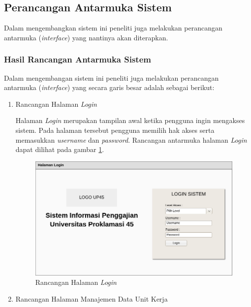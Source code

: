 		\subsection{Perancangan Antarmuka Sistem}
		Dalam mengembangkan sistem ini peneliti juga melakukan perancangan antarmuka (\emph{interface}) yang nantinya akan diterapkan.
		
		    \subsubsection{Hasil Rancangan Antarmuka Sistem}
		    Dalam mengembangan sistem ini peneliti juga melakukan perancangan antarmuka (\emph{interface}) yang secara garis besar adalah sebagai berikut:
		    \begin{enumerate}
		        \itemsep0em
		        \item Rancangan Halaman \emph{Login}
		        
		        Halaman \emph{Login} merupakan tampilan awal ketika pengguna ingin mengakses sistem. Pada halaman tersebut pengguna memilih hak akses serta memasukkan \emph{username} dan \emph{password}. Rancangan antarmuka halaman \emph{Login} dapat dilihat pada gambar \ref{halaman_login}.
		        \begin{figure}[H]
            	    \centering
            	    \includegraphics[width=11cm]{gambar/interface/halaman_login}
            	    \caption{Rancangan Halaman \emph{Login}}
            	    \label{halaman_login}
            	\end{figure}
		        \item Rancangan Halaman Manajemen Data Unit Kerja
		        

\end{enumerate}

